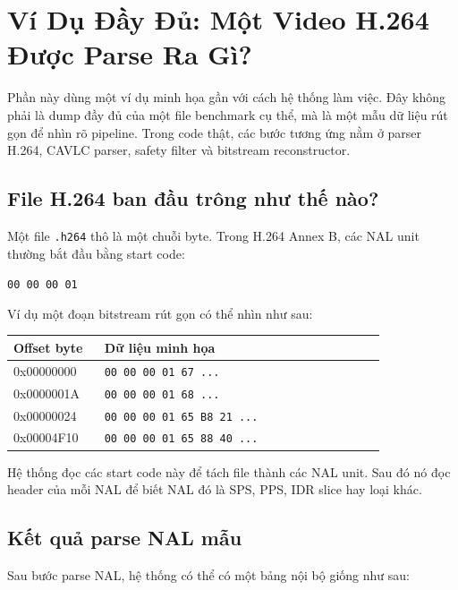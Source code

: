 \documentclass[11pt,a4paper]{article}
\begin{document}
\section{Ví Dụ Đầy Đủ: Một Video H.264 Được Parse Ra Gì?}

Phần này dùng một ví dụ minh họa gần với cách hệ thống làm việc. Đây không phải
là dump đầy đủ của một file benchmark cụ thể, mà là một mẫu dữ liệu rút gọn để
nhìn rõ pipeline. Trong code thật, các bước tương ứng nằm ở parser H.264,
CAVLC parser, safety filter và bitstream reconstructor.

\subsection{File H.264 ban đầu trông như thế nào?}

Một file \texttt{.h264} thô là một chuỗi byte. Trong H.264 Annex B, các NAL unit
thường bắt đầu bằng start code:

\begin{center}
\texttt{00 00 00 01}
\end{center}

Ví dụ một đoạn bitstream rút gọn có thể nhìn như sau:

\begin{center}
\begin{tabular}{p{0.22\linewidth}p{0.68\linewidth}}
\toprule
Offset byte & Dữ liệu minh họa \\
\midrule
0x00000000 &
\texttt{00 00 00 01 67 ...} \\
0x0000001A &
\texttt{00 00 00 01 68 ...} \\
0x00000024 &
\texttt{00 00 00 01 65 B8 21 ...} \\
0x00004F10 &
\texttt{00 00 00 01 65 88 40 ...} \\
\bottomrule
\end{tabular}
\end{center}

Hệ thống đọc các start code này để tách file thành các NAL unit. Sau đó nó đọc
header của mỗi NAL để biết NAL đó là SPS, PPS, IDR slice hay loại khác.

\subsection{Kết quả parse NAL mẫu}

Sau bước parse NAL, hệ thống có thể có một bảng nội bộ giống như sau:
\end{document}
